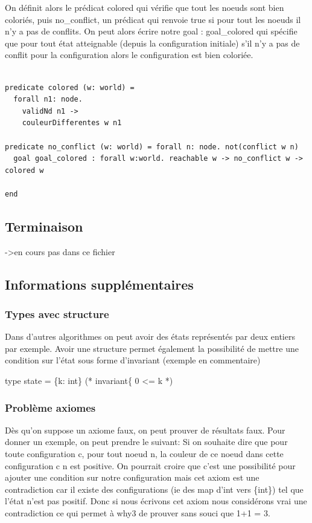 \documentclass[11pt]{article}
\begin{document}
On définit alors le prédicat colored qui vérifie que tout les noeuds sont bien coloriés, 
puis no\_conflict, un prédicat qui renvoie true si pour tout les noeuds il n'y a pas de conflits.
On peut alors écrire notre goal : goal\_colored qui spécifie que pour tout état atteignable (depuis 
la configuration initiale) s'il n'y a pas de conflit pour la configuration alors le configuration 
est bien coloriée. 

\lstset{language=why3,label= ,caption= ,captionpos=b,numbers=none}
\begin{lstlisting}

predicate colored (w: world) =
  forall n1: node.
    validNd n1 ->
    couleurDifferentes w n1

predicate no_conflict (w: world) = forall n: node. not(conflict w n)
  goal goal_colored : forall w:world. reachable w -> no_conflict w -> colored w

end

\end{lstlisting}

\subsection{Terminaison}
\label{sec:org79f504b}

->en cours pas dans ce fichier


\subsection{Informations supplémentaires}
\label{sec:orgc10e57b}

\subsubsection{Types avec structure}
\label{sec:org03376aa}

Dans d'autres algorithmes on peut avoir des états représentés par deux entiers par exemple.
Avoir une structure permet également la possibilité de mettre une condition sur l'état sous forme d'invariant (exemple en commentaire)

  type state = \{k: int\}
(*  invariant\{ 0 <= k  *)


\subsubsection{Problème axiomes}
\label{sec:org6396096}

Dès qu'on suppose un axiome faux, on peut prouver de résultats faux. 
Pour donner un exemple, on peut prendre le suivant: 
Si on souhaite dire que pour toute configuration c, pour tout noeud n, la couleur de ce noeud dans cette configuration c n est positive. 
On pourrait croire que c'est une possibilité pour ajouter une condition sur notre configuration mais cet axiom est une contradiction car il existe des configurations (ie des map d'int vers \{int\})
tel que l'état n'est pas positif.
Donc si nous écrivons cet axiom nous considérons vrai une contradiction ce qui permet à why3 de prouver sans souci que 1+1 = 3.
\end{document}
